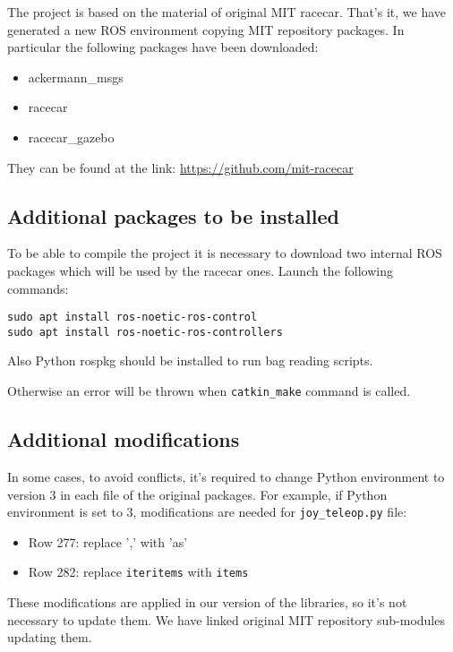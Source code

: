\documentclass[12pt, letterpaper]{report}
\begin{document}
The project is based on the material of original MIT racecar. That's it, we have generated a new ROS environment copying MIT repository packages. In particular the following packages have been downloaded:

\begin{itemize}
	\item ackermann\_msgs
	\item racecar
	\item racecar\_gazebo
\end{itemize} 

They can be found at the link: \url{https://github.com/mit-racecar}

\subsection{Additional packages to be installed}

To be able to compile the project it is necessary to download two internal ROS packages which will be used by the racecar ones. Launch the following commands:

\begin{verbatim}
sudo apt install ros-noetic-ros-control
sudo apt install ros-noetic-ros-controllers
\end{verbatim}

Also Python rospkg should be installed to run bag reading scripts.

\noindent Otherwise an error will be thrown when \verb|catkin_make| command is called.

\subsection{Additional modifications}

In some cases, to avoid conflicts, it's required to change Python environment to version 3 in each file of the original packages.
For example, if Python environment is set to 3, modifications are needed for \verb|joy_teleop.py| file:

\begin{itemize}
	\item Row 277: replace ',' with 'as'
	\item Row 282: replace \verb|iteritems| with \verb|items|
\end{itemize}

These modifications are applied in our version of the libraries, so it's not necessary to update them. We have linked original MIT repository sub-modules updating them.
\end{document}
